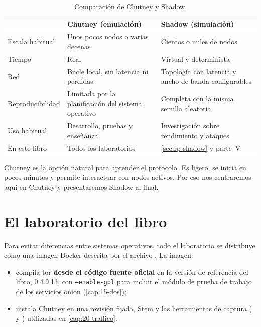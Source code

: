 \begin{table}[htbp]
\centering\small
\begin{tabularx}{\textwidth}{@{}l>{\raggedright\arraybackslash}X>{\raggedright\arraybackslash}X@{}}
\toprule
 & Chutney (emulación) & Shadow (simulación) \\
\midrule
Escala habitual & Unos pocos nodos o varias decenas & Cientos o miles de nodos \\
Tiempo & Real & Virtual y determinista \\
Red & Bucle local, sin latencia ni pérdidas & Topología con latencia y ancho de banda configurables \\
Reproducibilidad & Limitada por la planificación del sistema operativo & Completa con la misma semilla aleatoria \\
Uso habitual & Desarrollo, pruebas y enseñanza & Investigación sobre rendimiento y ataques \\
En este libro & Todos los laboratorios & \cref{sec:rp-shadow} y parte~V \\
\bottomrule
\end{tabularx}
\caption{Comparación de Chutney y Shadow.}
\label{tab:chutney-shadow}
\end{table}

Chutney es la opción natural para aprender el protocolo. Es ligero, se inicia en pocos minutos y permite interactuar con nodos activos. Por eso nos centraremos aquí en Chutney y presentaremos Shadow al final.

\section{El laboratorio del libro}\label{sec:rp-avvio}

Para evitar diferencias entre sistemas operativos, todo el laboratorio se distribuye como una imagen Docker descrita por el archivo . La imagen:
\begin{itemize}
  \item compila tor \textbf{desde el código fuente oficial} en la versión de referencia del libro, 0.4.9.13, con \texttt{--enable-gpl} para incluir el módulo de prueba de trabajo de los servicios onion (\cref{cap:15-dos});
  \item instala Chutney en una revisión fijada, Stem y las herramientas de captura ( y ) utilizadas en \cref{cap:20-traffico}.
\end{itemize}

